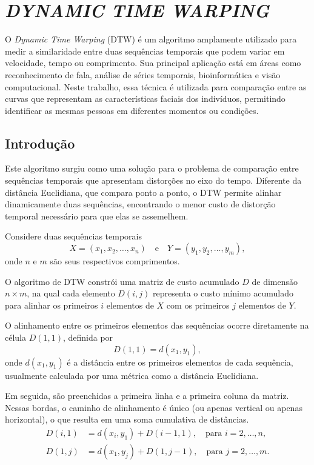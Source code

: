\chapter{\textit{DYNAMIC TIME WARPING}} \label{cha:dtw}

O \textit{Dynamic Time Warping} (DTW) \cite{tavenard.blog.dtw} é um algoritmo amplamente utilizado para medir a similaridade entre duas sequências temporais que podem variar em velocidade, tempo ou comprimento. Sua principal aplicação está em áreas como reconhecimento de fala, análise de séries temporais, bioinformática e visão computacional. Neste trabalho, essa técnica é utilizada para comparação entre as curvas que representam as características faciais dos indivíduos, permitindo identificar as mesmas pessoas em diferentes momentos ou condições.

\section{Introdução}

Este algoritmo surgiu como uma solução para o problema de comparação entre sequências temporais que apresentam distorções no eixo do tempo. Diferente da distância Euclidiana, que compara ponto a ponto, o DTW permite alinhar dinamicamente duas sequências, encontrando o menor custo de distorção temporal necessário para que elas se assemelhem.

Considere duas sequências temporais
\begin{equation}
    X = (x_1, x_2, \ldots, x_n) \quad \text{e} \quad Y = (y_1, y_2, \ldots, y_m),
\end{equation}
onde \(n\) e \(m\) são seus respectivos comprimentos.

O algoritmo de DTW constrói uma matriz de custo acumulado \(D\) de dimensão \(n \times m\), na qual cada elemento \(D(i, j)\) representa o custo mínimo acumulado para alinhar os primeiros \(i\) elementos de \(X\) com os primeiros \(j\) elementos de \(Y\).

O alinhamento entre os primeiros elementos das sequências ocorre diretamente na célula \(D(1,1)\), definida por
\begin{equation}
    D(1,1) = d(x_1, y_1),
\end{equation}
onde \(d(x_1, y_1)\) é a distância entre os primeiros elementos de cada sequência, usualmente calculada por uma métrica como a distância Euclidiana.

Em seguida, são preenchidas a primeira linha e a primeira coluna da matriz. Nessas bordas, o caminho de alinhamento é único (ou apenas vertical ou apenas horizontal), o que resulta em uma soma cumulativa de distâncias. 
\begin{align}
    D(i,1) &= d(x_i, y_1) + D(i-1,1), \quad \text{para } i = 2, \ldots, n, \\
    D(1,j) &= d(x_1, y_j) + D(1,j-1), \quad \text{para } j = 2, \ldots, m.
\end{align}

